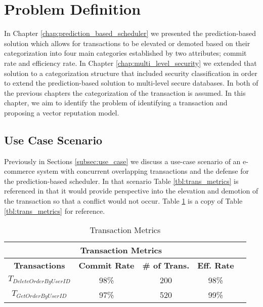 \section{Problem Definition}
\label{rep:problem_definition}

In Chapter \ref{chap:prediction_based_scheduler} we presented the prediction-based solution which allows for transactions to be elevated or demoted based on their categorization into four main categories established by two attributes; commit rate and efficiency rate. In Chapter \ref{chap:multi_level_security} we extended that solution to a categorization structure that included security classification in order to extend the prediction-based solution to multi-level secure databases. In both of the previous chapters the categorization of the transaction is assumed. In this chapter, we aim to identify the problem of identifying a transaction and proposing a vector reputation model.

\subsection{Use Case Scenario}
\label{rep:use_case_scenario}

Previously in Sections \ref{subsec:use_case} we discuss a use-case scenario of an e-commerce system with concurrent overlapping transactions and the defense for the prediction-based scheduler. In that scenario Table \ref{tbl:trans_metrics} is referenced in that it would provide perspective into the elevation and demotion of the transaction so that a conflict would not occur. Table \ref{tbl:rep_trans_metrics} is a copy of Table \ref{tbl:trans_metrics} for reference.

\begin{table}[h]
\captionsetup{justification=centering}
\centering
\begin{tabular}{|c|c|c|c|c|}
\hline
\multicolumn{4}{|c|}{\cellcolor[HTML]{EFEFEF}\textbf{Transaction Metrics}}                                                   \\ \hline
\textbf{Transactions} & \textbf{Commit Rate} & \textbf{\# of Trans.} & {\color[HTML]{000000} \textbf{Eff. Rate}} \\ \hline
$T_{DeleteOrderByUserID}$         & 98\%                  & 200                         & 98\%                                          \\ \hline
$T_{GetOrderByUserID}$          & 97\%                     & 520                           & 99\%                                              \\ \hline
\end{tabular}

\caption{Transaction Metrics} %
\label{tbl:rep_trans_metrics} %

\end{table}

